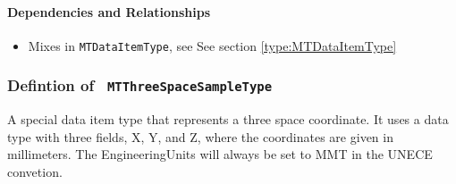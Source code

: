\paragraph{Dependencies and Relationships}

\begin{itemize}
\item Mixes in \texttt{MTDataItemType}, see See section \ref{type:MTDataItemType}
\end{itemize}
\FloatBarrier
\subsubsection{Defintion of \texttt{ MTThreeSpaceSampleType}}
  \label{type:MTThreeSpaceSampleType}

\FloatBarrier

A special data item type that represents a three space coordinate. It uses a data type with three fields, X, Y, and Z, where 
the coordinates are given in millimeters. The EngineeringUnits will always be set to MMT in the UNECE convetion.


